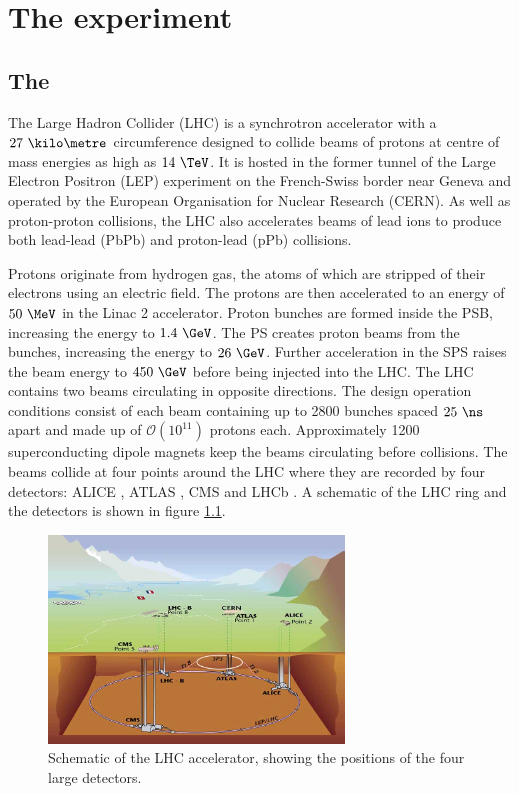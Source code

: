 \chapter{The \CMS experiment}
\label{chap:detector}

\section{The \LHC}
\label{sec:theLHC}

The Large Hadron Collider (LHC) \cite{theLHC} is a synchrotron accelerator
with a $27~\kilo\metre$ circumference designed to
collide beams of protons at centre of mass energies as high as $14~\TeV$. It is
hosted in the former tunnel of the Large Electron Positron (LEP) \cite{LEP:1983aa} experiment on the French-Swiss border
near Geneva and operated by the European Organisation for Nuclear Research
(CERN). As well as proton-proton collisions, the LHC also accelerates beams of
lead ions to produce both lead-lead (PbPb) and proton-lead (pPb) collisions.

Protons originate from hydrogen gas, the atoms of which are stripped of
their electrons using an electric field. The protons are then accelerated to an
energy of $50~\MeV$ in the Linac 2 accelerator. Proton bunches are formed inside
the \ac{PSB}, increasing the energy to $1.4~\GeV$. The \ac{PS} creates proton
beams from the bunches, increasing the energy to $26~\GeV$. Further acceleration
in the \ac{SPS} raises the beam energy to $450~\GeV$ before being injected into
the LHC. The LHC contains two beams circulating in opposite directions. The
design operation conditions consist of each beam containing up to 2800 bunches
spaced $25~\ns$ apart and made up of $\mathcal{O}(10^{11})$ protons each. 
Approximately 1200 superconducting dipole magnets keep the beams circulating
before collisions. The beams collide at four points around the LHC where they
are recorded by four detectors: ALICE \cite{Aamodt:2008zz}, ATLAS
\cite{Aad:2008zzm}, CMS \cite{Chatrchyan:2008aa} and LHCb \cite{Alves:2008zz}. A
schematic of the LHC ring and the detectors is shown in figure
\ref{fig:LHCschematic}.

\begin{figure}[htbp]
   \includegraphics[width=0.7\textwidth]{plots/detector/LHC_layout_sch.jpg}
\caption{Schematic of the LHC accelerator, showing the positions of the four
large detectors.}
\label{fig:LHCschematic}
\end{figure}

